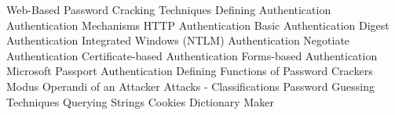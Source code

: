 Web-Based Password Cracking Techniques
	Defining Authentication
	Authentication Mechanisms
	HTTP Authentication
	Basic Authentication
	Digest Authentication
	Integrated Windows (NTLM) Authentication
	Negotiate Authentication
	Certificate-based Authentication
	Forms-based Authentication
	Microsoft Passport Authentication
	Defining Functions of Password Crackers
	Modus Operandi of an Attacker
	Attacks - Classifications
	Password Guessing Techniques
	Querying Strings
	Cookies
	Dictionary Maker